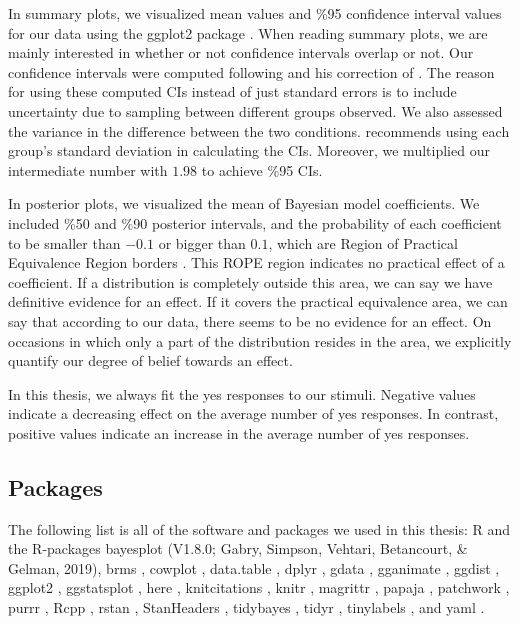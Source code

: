 In summary plots, we visualized mean values and \%95 confidence interval values for our data using the ggplot2 package \citep{ggplot}. When reading summary plots, we are mainly interested in whether or not confidence intervals overlap or not. Our confidence intervals were computed following  and his correction of . The reason for using these computed CIs instead of just standard errors is to include uncertainty due to sampling between different groups observed. We also assessed the variance in the difference between the two conditions.  recommends using each group's standard deviation in calculating the CIs. Moreover, we multiplied our intermediate number with $1.98$ to achieve \%95 CIs. 

In posterior plots, we visualized the mean of Bayesian model coefficients. We included \%50 and \%90 posterior intervals, and the probability of each coefficient to be smaller than $-0.1$ or bigger than $0.1$, which are Region of Practical Equivalence Region borders . This ROPE region indicates no practical effect of a coefficient. If a distribution is completely outside this area, we can say we have definitive evidence for an effect. If it covers the practical equivalence area, we can say that according to our data, there seems to be no evidence for an effect. On occasions in which only a part of the distribution resides in the area, we explicitly quantify our degree of belief towards an effect. 

In this thesis, we always fit the yes responses to our stimuli. Negative values indicate a decreasing effect on the average number of yes responses. In contrast, positive values indicate an increase in the average number of yes responses.

\subsection{Packages}

The following list is all of the software and packages we used in this thesis: 
R \citep[v4.0.3;][]{R-base} and the R-packages 
bayesplot (V1.8.0; Gabry, Simpson, Vehtari, Betancourt, \& Gelman, 2019),
brms \citep[v2.14.4;][]{R-brms_a, R-brms_b}, 
cowplot \citep[v1.1.1;][]{R-cowplot}, 
data.table \citep[v1.14.2;][]{R-data.table}, 
dplyr \citep[v1.0.8;][]{R-dplyr}, 
gdata \citep[v2.18.0;][]{R-gdata}, 
gganimate \citep[v1.0.7;][]{R-gganimate}, 
ggdist \citep[v2.4.0;][]{R-ggdist}, 
ggplot2 \citep[v3.3.5;][]{R-ggplot2}, 
ggstatsplot \citep[v0.8.0;][]{R-ggstatsplot}, 
here \citep[v1.0.1;][]{R-here}, 
knitcitations \citep[v1.0.12;][]{R-knitcitations}, 
knitr \citep[v1.37;][]{R-knitr}, 
magrittr \citep[v2.0.2.9000;][]{R-magrittr}, 
papaja \citep[v0.1.0.9997;][]{R-papaja}, 
patchwork \citep[v1.1.1;][]{R-patchwork}, 
purrr \citep[v0.3.4.9000;][]{R-purrr}, 
Rcpp \citep[v1.0.8;][]{R-Rcpp_a, R-Rcpp_b}, 
rstan \citep[v2.21.2;][]{R-rstan}, 
StanHeaders \citep[v2.21.0.7;][]{R-StanHeaders}, 
tidybayes \citep[v2.3.1;][]{R-tidybayes}, 
tidyr \citep[v1.1.3.9000;][]{R-tidyr}, 
tinylabels \citep[v0.2.1;][]{R-tinylabels}, and 
yaml \citep[v2.2.2;][]{R-yaml}.


